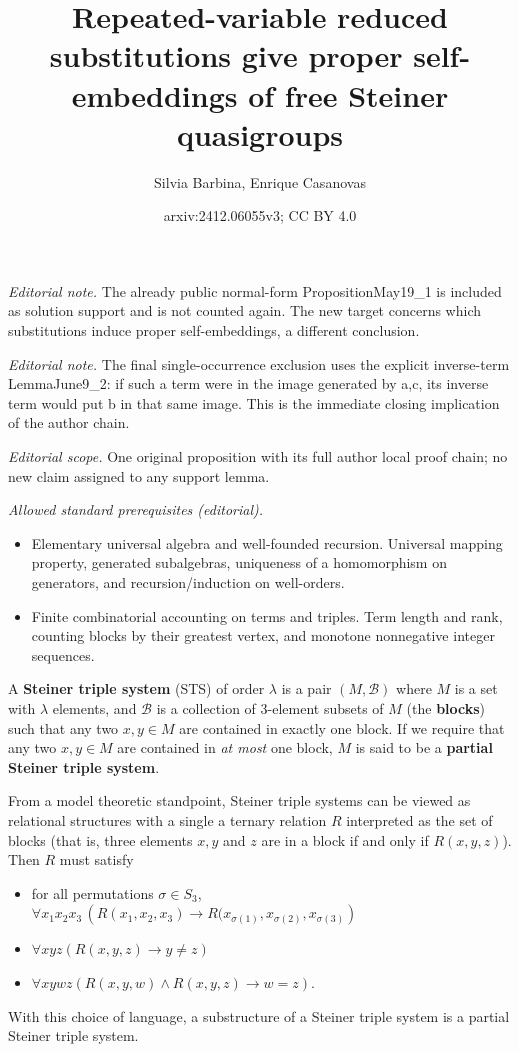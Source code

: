 \documentclass[10pt,a4paper]{article}
\title{Repeated-variable reduced substitutions give proper self-embeddings of free Steiner quasigroups}
\author{Silvia Barbina, Enrique Casanovas}
\date{arxiv:2412.06055v3; CC BY 4.0}
\theoremstyle{note}
\begin{document}
\maketitle
\noindent\textit{Editorial note.} The already public normal-form PropositionMay19\_1 is included as solution support and is not counted again. The new target concerns which substitutions induce proper self-embeddings, a different conclusion.\par\medskip
\noindent\textit{Editorial note.} The final single-occurrence exclusion uses the explicit inverse-term LemmaJune9\_2: if such a term were in the image generated by a,c, its inverse term would put b in that same image. This is the immediate closing implication of the author chain.\par\medskip
\noindent\textit{Editorial scope.} One original proposition with its full author local proof chain; no new claim assigned to any support lemma.\par\medskip
\noindent\textit{Allowed standard prerequisites (editorial).}\begin{itemize}
\item Elementary universal algebra and well-founded recursion. Universal mapping property, generated subalgebras, uniqueness of a homomorphism on generators, and recursion/induction on well-orders.
\item Finite combinatorial accounting on terms and triples. Term length and rank, counting blocks by their greatest vertex, and monotone nonnegative integer sequences.
\end{itemize}\medskip
A \textbf{Steiner triple system} (STS) of order $\lambda$ is a pair $(M, \mathcal{B})$ where $M$ is a set with $\lambda$ elements, and 
 $\mathcal{B}$ is a collection of 3-element subsets of $M$ (the \textbf{blocks})
such that any two $x, y \in M$ are contained in exactly one block. If we require that any two $x,y \in M$ are contained in \textit{at most }one block, $M$ is said to be a  \textbf{partial Steiner triple system}.

From a model theoretic standpoint, Steiner triple systems can be viewed as relational structures with a single a ternary relation $R$ interpreted as the set of blocks (that is, three elements $x, y$ and $z$ are in a block if and only if $R(x,y,z)$). Then $R$ must satisfy
\begin{itemize}
\item for all permutations $\sigma \in S_3$, $ \forall x_1 x_2 x_3 \, \left(R(x_1, x_2, x_3) \rightarrow R(x_{\sigma(1)}, x_{\sigma(2)}, x_{\sigma(3)} \right)$
\item $\forall x y z \left( R(x,y,z) \rightarrow y\neq z \right)$
\item $\forall x y w z \left( R(x,y,w) \wedge R(x,y,z) \rightarrow w=z \right)$.
\end{itemize}
With this choice of language, a substructure of a Steiner triple system is a partial Steiner triple system.
\end{document}
